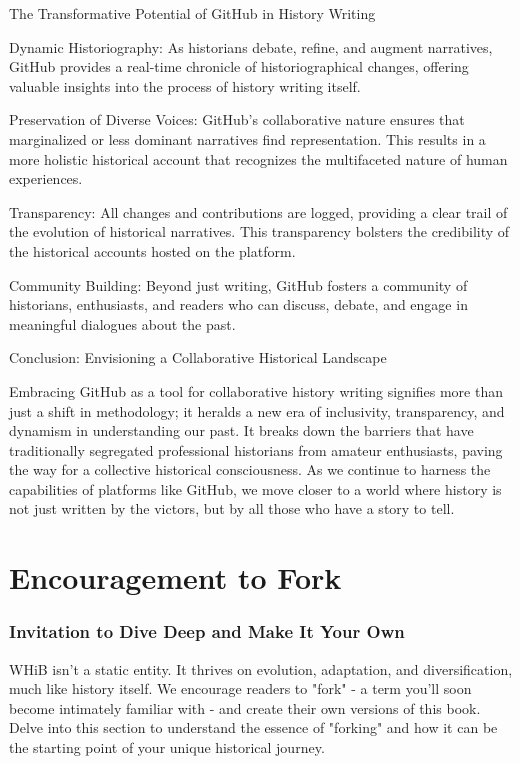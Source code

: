 \documentclass[a4paper,12pt]{book}
\begin{document}
The Transformative Potential of GitHub in History Writing

Dynamic Historiography: As historians debate, refine, and augment narratives, GitHub provides a real-time chronicle of historiographical changes, offering valuable insights into the process of history writing itself.

Preservation of Diverse Voices: GitHub's collaborative nature ensures that marginalized or less dominant narratives find representation. This results in a more holistic historical account that recognizes the multifaceted nature of human experiences.

Transparency: All changes and contributions are logged, providing a clear trail of the evolution of historical narratives. This transparency bolsters the credibility of the historical accounts hosted on the platform.

Community Building: Beyond just writing, GitHub fosters a community of historians, enthusiasts, and readers who can discuss, debate, and engage in meaningful dialogues about the past.

Conclusion: Envisioning a Collaborative Historical Landscape

Embracing GitHub as a tool for collaborative history writing signifies more than just a shift in methodology; it heralds a new era of inclusivity, transparency, and dynamism in understanding our past. It breaks down the barriers that have traditionally segregated professional historians from amateur enthusiasts, paving the way for a collective historical consciousness. As we continue to harness the capabilities of platforms like GitHub, we move closer to a world where history is not just written by the victors, but by all those who have a story to tell.

\chapter{Encouragement to Fork}
\subsection*{Invitation to Dive Deep and Make It Your Own}
WHiB isn't a static entity. It thrives on evolution, adaptation, and diversification, much like history itself. We encourage readers to "fork" - a term you'll soon become intimately familiar with - and create their own versions of this book. Delve into this section to understand the essence of "forking" and how it can be the starting point of your unique historical journey.
\end{document}
